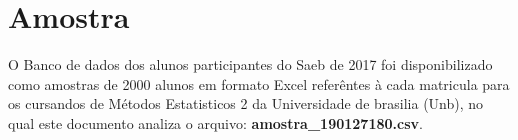 
\chapter{Amostra}
O Banco de dados dos alunos participantes do Saeb de 2017 foi disponibilizado como amostras de 2000 alunos em formato Excel referêntes à cada matricula para os cursandos de Métodos Estatisticos 2 da Universidade de brasilia (Unb), no qual este documento analiza o arquivo: \textbf{amostra\_190127180.csv}.
